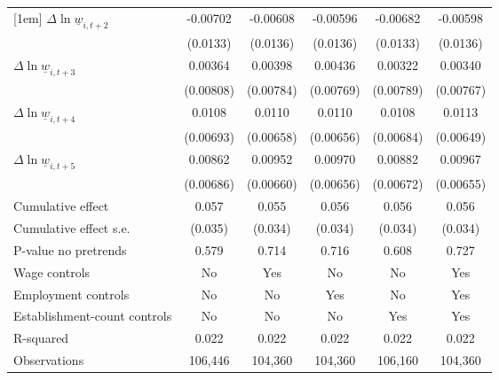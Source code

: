 {\begin{tabular}{l*{5}{c}}
[1em]
$\Delta \ln \underline{w}_{i,t+2}$& -0.00702         & -0.00608         & -0.00596         & -0.00682         & -0.00598         \\
          & (0.0133)         & (0.0136)         & (0.0136)         & (0.0133)         & (0.0136)         \\
[1em]
$\Delta \ln \underline{w}_{i,t+3}$&  0.00364         &  0.00398         &  0.00436         &  0.00322         &  0.00340         \\
          &(0.00808)         &(0.00784)         &(0.00769)         &(0.00789)         &(0.00767)         \\
[1em]
$\Delta \ln \underline{w}_{i,t+4}$&   0.0108         &   0.0110         &   0.0110\sym{*}  &   0.0108         &   0.0113\sym{*}  \\
          &(0.00693)         &(0.00658)         &(0.00656)         &(0.00684)         &(0.00649)         \\
[1em]
$\Delta \ln \underline{w}_{i,t+5}$&  0.00862         &  0.00952         &  0.00970         &  0.00882         &  0.00967         \\
          &(0.00686)         &(0.00660)         &(0.00656)         &(0.00672)         &(0.00655)         \\
\hline
Cumulative effect&    0.057         &    0.055         &    0.056         &    0.056         &    0.056         \\
Cumulative effect s.e.&  (0.035)         &  (0.034)         &  (0.034)         &  (0.034)         &  (0.034)         \\
P-value no pretrends&    0.579         &    0.714         &    0.716         &    0.608         &    0.727         \\
Wage controls&       No         &      Yes         &       No         &       No         &      Yes         \\
Employment controls&       No         &       No         &      Yes         &       No         &      Yes         \\
Establishment-count controls&       No         &       No         &       No         &      Yes         &      Yes         \\
R-squared &    0.022         &    0.022         &    0.022         &    0.022         &    0.022         \\
Observations&  106,446         &  104,360         &  104,360         &  106,160         &  104,360         \\
\hline\hline
\end{tabular}
}
